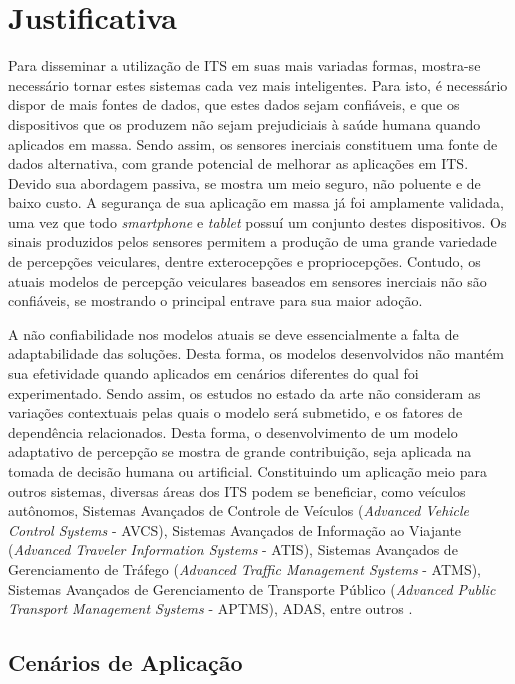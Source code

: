 \section{Justificativa}

Para disseminar a utilização de ITS em suas mais variadas formas, mostra-se necessário tornar estes sistemas cada vez mais inteligentes. Para isto, é necessário dispor de mais fontes de dados, que estes dados sejam confiáveis, e que os dispositivos que os produzem não sejam prejudiciais à saúde humana quando aplicados em massa. Sendo assim, os sensores inerciais constituem uma fonte de dados alternativa, com grande potencial de melhorar as aplicações em ITS. Devido sua abordagem passiva, se mostra um meio seguro, não poluente e de baixo custo. A segurança de sua aplicação em massa já foi amplamente validada, uma vez que todo \textit{smartphone} e \textit{tablet} possuí um conjunto destes dispositivos. Os sinais produzidos pelos sensores permitem a produção de uma grande variedade de percepções veiculares, dentre exterocepções e propriocepções. Contudo, os atuais modelos de percepção veiculares baseados em sensores inerciais não são confiáveis, se mostrando o principal entrave para sua maior adoção.

A não confiabilidade nos modelos atuais se deve essencialmente a falta de adaptabilidade das soluções. Desta forma, os modelos desenvolvidos não mantém sua efetividade quando aplicados em cenários diferentes do qual foi experimentado. Sendo assim, os estudos no estado da arte não consideram as variações contextuais pelas quais o modelo será submetido, e os fatores de dependência relacionados. Desta forma, o desenvolvimento de um modelo adaptativo de percepção se mostra de grande contribuição, seja aplicada na tomada de decisão humana ou artificial. Constituindo um aplicação meio para outros sistemas, diversas áreas dos ITS podem se beneficiar, como veículos autônomos, Sistemas Avançados de Controle de Veículos (\textit{Advanced Vehicle Control Systems} - AVCS), Sistemas Avançados de Informação ao Viajante (\textit{Advanced Traveler Information Systems} - ATIS), Sistemas Avançados de Gerenciamento de Tráfego (\textit{Advanced Traffic Management Systems} - ATMS), Sistemas Avançados de Gerenciamento de Transporte Público (\textit{Advanced Public Transport Management Systems} - APTMS), ADAS, entre outros \cite{Zhang2011,Singh2015}.

\subsection{Cenários de Aplicação}

